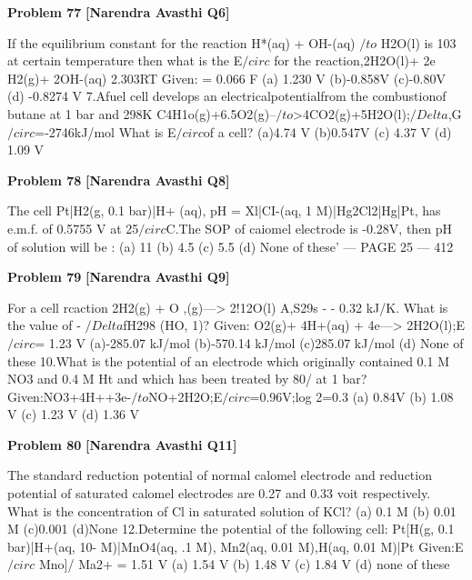 \begin{problembox}
\textbf{Problem 77} \hfill \textbf{[Narendra Avasthi Q6]}
\label{q:ext-narendra_avasthi_all_questions-77}

If the equilibrium constant for the reaction H*(aq) + OH-(aq) $/to$ H2O(l) is 103 at certain
temperature then what is the E$/circ$ for the reaction,2H2O(l)+ 2e H2(g)+ 2OH-(aq)
2.303RT
Given:
= 0.066
F
(a) 1.230 V
(b)-0.858V
(c)-0.80V
(d) -0.8274 V
7.Afuel cell develops an electricalpotentialfrom the combustionof butane at 1 bar and 298K
C4H1o(g)+6.5O2(g)--$/to$>4CO2(g)+5H2O(l);$/Delta$,G$/circ$=-2746kJ/mol
What is E$/circ$of a cell?
(a)4.74 V
(b)0.547V
(c) 4.37 V
(d) 1.09 V
\end{problembox}

\begin{problembox}
\textbf{Problem 78} \hfill \textbf{[Narendra Avasthi Q8]}
\label{q:ext-narendra_avasthi_all_questions-78}

The cell Pt|H2(g, 0.1 bar)|H+ (aq), pH = Xl|CI-(aq, 1 M)|Hg2Cl2|Hg|Pt,
has e.m.f. of 0.5755 V at 25$/circ$C.The SOP of caiomel electrode is -0.28V, then pH of solution
will be :
(a) 11
(b) 4.5
(c) 5.5
(d) None of these'
--- PAGE 25 ---
412
\end{problembox}

\begin{problembox}
\textbf{Problem 79} \hfill \textbf{[Narendra Avasthi Q9]}
\label{q:ext-narendra_avasthi_all_questions-79}

For a cell rcaction 2H2(g) + O ,(g)---> 2!12O(l) A,S29s - - 0.32 kJ/K. What is the value of -
$/Delta$fH298 (HO, 1)?
Given:
O2(g)+ 4H+(aq) + 4e---> 2H2O(l);E$/circ$= 1.23 V
(a)-285.07 kJ/mol
(b)-570.14 kJ/mol
(c)285.07 kJ/mol
(d) None of these
10.What is the potential of an electrode which originally contained 0.1 M NO3 and 0.4 M Ht
and which has been treated by 80/%
at 1 bar?
Given:NO3+4H++3e-$/to$NO+2H2O;E$/circ$=0.96V;log 2=0.3
(a) 0.84V
(b) 1.08 V
(c) 1.23 V
(d) 1.36 V
\end{problembox}

\begin{problembox}
\textbf{Problem 80} \hfill \textbf{[Narendra Avasthi Q11]}
\label{q:ext-narendra_avasthi_all_questions-80}

The standard reduction potential of normal calomel electrode and reduction potential of
saturated calomel electrodes are 0.27 and 0.33 voit respectively. What is the concentration of
Cl in saturated solution of KCl?
(a) 0.1 M
(b) 0.01 M
(c)0.001
(d)None
12.Determine the potential of the following cell:
Pt[H(g, 0.1 bar)|H+(aq, 10- M)|MnO4(aq, .1 M),
Mn$2$(aq, 0.01 M),H(aq, 0.01 M)|Pt
Given:E$/circ$
Mno]/ Ma2+ = 1.51 V
(a) 1.54 V
(b) 1.48 V
(c) 1.84 V
(d) none of these
\end{problembox}

